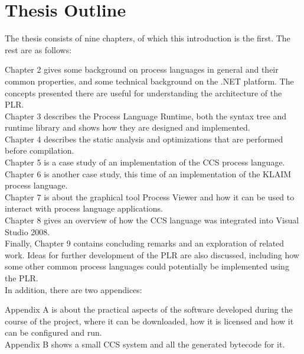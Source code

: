 \section{Thesis Outline}

	The thesis consists of nine chapters, of which this introduction is the 
	first. The rest are as follows:

	Chapter 2 gives some background on process languages in general and their 
	common properties, and some technical background on the .NET platform. The 
	concepts presented there are useful for understanding the architecture of 
	the PLR.\\
	Chapter 3 describes the Process Language Runtime, both the syntax tree and 
	runtime library and shows how they are designed and implemented. \\
	Chapter 4 describes the static analysis and optimizations that are performed
	before compilation.\\
	Chapter 5 is a case study of an implementation of the CCS process 
	language.\\
	Chapter 6 is another case study, this time of an implementation of the 
	KLAIM process language.\\
	Chapter 7 is about the graphical tool Process Viewer and how it can be used
	to interact with process language applications.\\
	Chapter 8 gives an overview of how the CCS language was integrated into 
	Visual Studio 2008. \\
	Finally, Chapter 9 contains concluding remarks and an exploration of related 
	work. Ideas for further development of the PLR are also discussed, including 
	how some other common process languages could potentially be implemented 
	using the PLR.\\
 
	In addition, there are two appendices:
	
	Appendix A is about the practical aspects of the software developed during 
	the course of the project, where it can be downloaded, how it is licensed 
	and how it can be configured and run.\\
	Appendix B shows a small CCS system and all the generated bytecode for it.